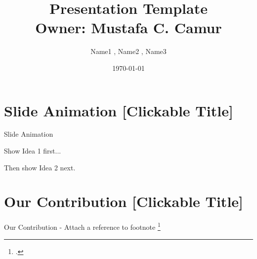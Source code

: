 \documentclass{beamer}
\title[Template2]{Presentation Template \\ Owner: Mustafa C. Camur}
\author[LastName1, LastName2, LastName3]{Name1 \inst{1}, Name2 \inst{1}, Name3 \inst{2}}
\institute{\inst{1} Institution1 \and %
\inst{2} Institution2}
\date{\today}
\newcommand{\stargraph}[2]{\begin{tikzpicture}
    \node[circle,fill=black] at (360:0mm) (center) {};
    \foreach \n in {1,...,#1}{
        \node[circle,fill=black] at ({\n*360/#1}:#2cm) (n\n) {};
        \draw (center)--(n\n);
        \node at (0,-#2*1.5) {$K_{1,#1}$}; %
    }
\end{tikzpicture}}
\begin{document}
\begin{frame}
    \titlepage
\end{frame}
 
 \begin{frame}
    \tableofcontents
\end{frame}
 \section{Slide Animation [Clickable Title]}
 \iffalse
\begin{frame}{Star}
   \begin{definition}
   \textbf{Star} is a complete bipartite graph (i.e., biclique) $K_{1,k}$; with one center node and $k$ leaves. 
   \end{definition}
\begin{figure}[htp]
  \stargraph{3}{1} \hfill
  \stargraph{4}{1} \hfill
  \stargraph{5}{1} \hfill
   \stargraph{6}{1} 
\end{figure}
\end{frame}
\fi 

\begin{frame}{Slide Animation}
   \begin{definition}
   Show Idea 1 first...
   \end{definition}
   \pause
   \begin{definition}
   Then show Idea 2 next.
   \end{definition}
\end{frame}


\section{Our Contribution [Clickable Title]}
\begin{frame}{Our Contribution - Attach a reference to footnote \tiny\footcite{camur}}

\end{frame}
\end{document}
